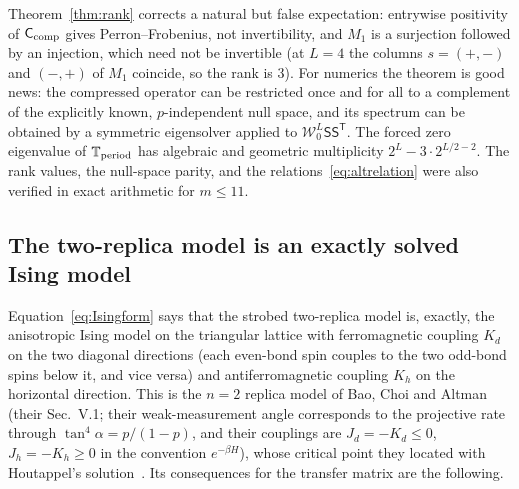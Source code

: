 \documentclass[aps,prx,reprint,superscriptaddress,nobibnotes,longbibliography]{revtex4-2}
\theoremstyle{remark}
\newcommand{\Ccomp}{\mathsf C_{\rm comp}}
\newcommand{\Tper}{\mathbb T_{\rm period}}
\begin{document}
Theorem~\ref{thm:rank} corrects a natural but false expectation: entrywise positivity of $\Ccomp$ gives Perron--Frobenius, not invertibility, and $M_1$ is a surjection followed by an injection, which need not be invertible (at $L=4$ the columns $s=(+,-)$ and $(-,+)$ of $M_1$ coincide, so the rank is $3$).  For numerics the theorem is good news: the compressed operator can be restricted once and for all to a complement of the explicitly known, $p$-independent null space, and its spectrum can be obtained by a symmetric eigensolver applied to $\mathcal W_0^{L}\mathsf S\mathsf S^{\mathsf T}$.  The forced zero eigenvalue of $\Tper$ has algebraic and geometric multiplicity $2^L-3\cdot2^{L/2-2}$.  The rank values, the null-space parity, and the relations~\eqref{eq:altrelation} were also verified in exact arithmetic for $m\le11$.

\subsection{The two-replica model is an exactly solved Ising model}
\label{sec:ising}

Equation~\eqref{eq:Isingform} says that the strobed two-replica model is, exactly, the anisotropic Ising model on the triangular lattice with ferromagnetic coupling $K_d$ on the two diagonal directions (each even-bond spin couples to the two odd-bond spins below it, and vice versa) and antiferromagnetic coupling $K_h$ on the horizontal direction.  This is the $n=2$ replica model of Bao, Choi and Altman~\cite{Bao2020} (their Sec.~V.1; their weak-measurement angle corresponds to the projective rate through $\tan^4\alpha=p/(1-p)$, and their couplings are $J_d=-K_d\le0$, $J_h=-K_h\ge0$ in the convention $e^{-\beta H}$), whose critical point they located with Houtappel's solution~\cite{Houtappel1950}.  Its consequences for the transfer matrix are the following.
\end{document}
